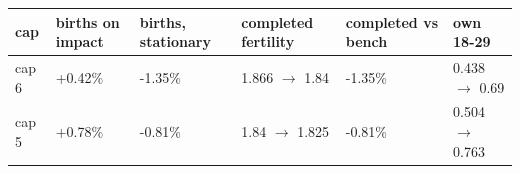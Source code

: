 \begingroup\small
\setlength{\tabcolsep}{3pt}
\renewcommand{\arraystretch}{1.04}
\begin{tabularx}{\linewidth}{XXXXXX}
\toprule
cap & births on impact & births, stationary & completed fertility & completed vs bench & own 18-29 \\
\midrule
cap 6 & +0.42\% & -1.35\% & 1.866 $\to$ 1.84 & -1.35\% & 0.438 $\to$ 0.69 \\
cap 5 & +0.78\% & -0.81\% & 1.84 $\to$ 1.825 & -0.81\% & 0.504 $\to$ 0.763 \\
\bottomrule
\end{tabularx}
\endgroup
